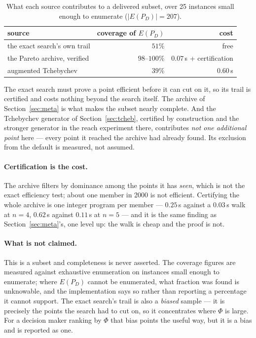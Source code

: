 \documentclass[11pt,a4paper]{article}
\newcommand{\Dset}{D}
\newcommand{\E}{E(P_{\Dset})}
\begin{document}
\begin{table}[h]
\centering
\caption{What each source contributes to a delivered subset, over 25
instances small enough to enumerate ($|\E| = 207$).}
\begin{tabular}{lrr}
\toprule
source & coverage of $\E$ & cost \\
\midrule
the exact search's own trail & $51\%$ & free \\
the Pareto archive, verified & $98$--$100\%$ & $0.07$\,s + certification \\
augmented Tchebychev         & $39\%$ & $0.60$\,s \\
\bottomrule
\end{tabular}
\end{table}

\noindent
The exact search must prove a point efficient before it can cut on it, so its
trail is certified and costs nothing beyond the search itself.  The archive of
Section~\ref{sec:meta} is what makes the subset nearly complete.  And the
Tchebychev generator of Section~\ref{sec:tcheb}, certified by construction and
the stronger generator in the reach experiment there, contributes \emph{not one
additional point} here --- every point it reached the archive had already found.
Its exclusion from the default is measured, not assumed.

\paragraph{Certification is the cost.}  The archive filters by dominance among
the points it has \emph{seen}, which is not the exact efficiency test; about
one member in 2000 is not efficient.  Certifying the whole archive is one
integer program per member --- $0.25$\,s against a $0.03$\,s walk at $n=4$,
$0.62$\,s against $0.11$\,s at $n=5$ --- and it is the same finding as
Section~\ref{sec:meta}'s, one level up: the walk is cheap and the proof is not.

\paragraph{What is not claimed.}  This is a subset and completeness is never
asserted.  The coverage figures are measured against exhaustive enumeration on
instances small enough to enumerate; where $\E$ cannot be enumerated, what
fraction was found is unknowable, and the implementation says so rather than
reporting a percentage it cannot support.  The exact search's trail is also a
\emph{biased} sample --- it is precisely the points the search had to cut on, so
it concentrates where $\Phi$ is large.  For a decision maker ranking by $\Phi$
that bias points the useful way, but it is a bias and is reported as one.
\end{document}
